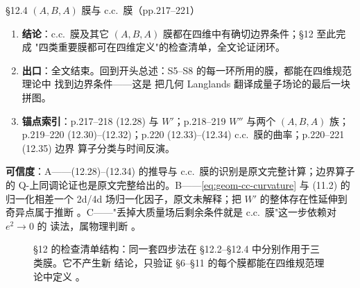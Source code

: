 \begin{kcard}{\S12.4 $(A,B,A)$ 膜与 c.c.\ 膜（pp.217--221）}
\begin{enumerate}[label=\textbf{\arabic*}]
  中"把整体全纯函数量子化为微分算子"所依赖的 Q-不变性与 T 论证在四维中的来源
  \pA{}。
\item \textbf{结论}：c.c.\ 膜及其它 $(A,B,A)$ 膜都在四维中有确切边界条件；\S12 至此完成
  "四类重要膜都可在四维定义"的检查清单，全文论证闭环。
\item \textbf{出口}：全文结束。回到开头总述：S5--S8 的每一环所用的膜，都能在四维规范理论中
  找到边界条件——这是 \kw{} 把几何 Langlands 翻译成量子场论的最后一块拼图。
\item \textbf{锚点索引}：p.217--218 (12.28) 与 $W'$；p.218--219 $W''$ 与两个 $(A,B,A)$ 族；
  p.219--220 (12.30)--(12.32)；p.220 (12.33)--(12.34) c.c.\ 膜的曲率；p.220--221 (12.35) 边界
  算子分类与时间反演。
\end{enumerate}
\textbf{可信度}：A——(12.28)--(12.34) 的推导与 c.c.\ 膜的识别是原文完整计算；边界算子的
Q-上同调论证也是原文完整给出的。B——\eqref{eq:geom-cc-curvature} 与 (11.2) 的归一化相差一个
2d/4d 场归一化因子，原文未解释；把 $W'$ 的整体存在性延伸到奇异点属于推断
\pB{}。C——"丢掉大质量场后剩余条件就是 c.c.\ 膜"这一步依赖对 $e^2\to0$ 的
读法，属物理判断 \pC{}。
\end{kcard}

\begin{figure}[htbp]
\centering
{}
\caption{\S12 的检查清单结构：同一套四步法在 \S12.2--\S12.4 中分别作用于三类膜。它不产生新
结论，只验证 \S6--\S11 的每个膜都能在四维规范理论中定义 \pA{}。}
\label{fig:geom-checklist}
\end{figure}


